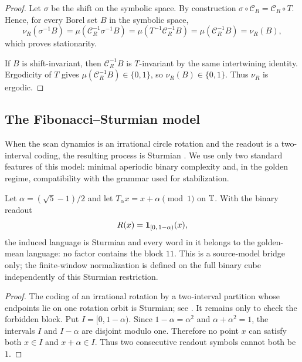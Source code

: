 \begin{proof}
Let $\sigma$ be the shift on the symbolic space.  By construction
$\sigma\circ\mathcal C_R=\mathcal C_R\circ T$.  Hence, for every Borel set
$B$ in the symbolic space,
\[
\nu_R(\sigma^{-1}B)
=\mu(\mathcal C_R^{-1}\sigma^{-1}B)
=\mu(T^{-1}\mathcal C_R^{-1}B)
=\mu(\mathcal C_R^{-1}B)
=\nu_R(B),
\]
which proves stationarity.

If $B$ is shift-invariant, then $\mathcal C_R^{-1}B$ is $T$-invariant by the
same intertwining identity.  Ergodicity of $T$ gives
$\mu(\mathcal C_R^{-1}B)\in\{0,1\}$, so $\nu_R(B)\in\{0,1\}$.  Thus $\nu_R$
is ergodic.
\end{proof}

\subsection{The Fibonacci--Sturmian model}\label{sec:readout:sturmian}

When the scan dynamics is an irrational circle rotation and the readout is a two-interval coding, the resulting process is Sturmian \cite{MorseHedlund1940,Lothaire2002,Queffelec2010}. We use only two standard features of this model: minimal aperiodic binary complexity and, in the golden regime, compatibility with the grammar used for stabilization.

\begin{proposition}\label{prop:sturmian-no11}
Let $\alpha=(\sqrt5-1)/2$ and let $T_\alpha x=x+\alpha\pmod 1$ on $\mathbb{T}$.
With the binary readout
\[
R(x)=\mathbf{1}_{[0,\,1-\alpha)}(x),
\]
the induced language is Sturmian and every word in it belongs to the
golden-mean language: no factor contains the block $11$.
This is a source-model bridge only; the finite-window normalization is defined
on the full binary cube independently of this Sturmian restriction.
\end{proposition}

\begin{proof}
The coding of an irrational rotation by a two-interval partition whose
endpoints lie on one rotation orbit is Sturmian; see
\cite{MorseHedlund1940,Lothaire2002,Queffelec2010}.  It remains only to check
the forbidden block.  Put $I=[0,1-\alpha)$.  Since $1-\alpha=\alpha^2$ and
$\alpha+\alpha^2=1$, the intervals $I$ and $I-\alpha$ are disjoint modulo
one.  Therefore no point $x$ can satisfy both $x\in I$ and
$x+\alpha\in I$.  Thus two consecutive readout symbols cannot both be $1$.
\end{proof}

